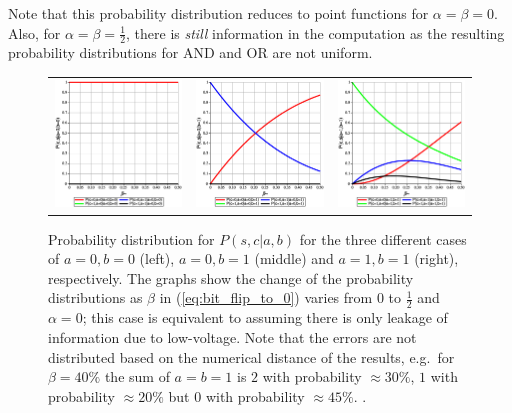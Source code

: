 Note that this probability distribution reduces to point functions for $\alpha = \beta = 0$. Also, for $\alpha = \beta = \frac{1}{2}$, there is {\em still} information in the computation as the resulting probability distributions for AND and OR are not uniform.

\begin{figure}
    \begin{tabular}{ccc}
        \includegraphics[width=.3\textwidth]{media/noisy_half_adder_value_dist_00.eps} &
        \includegraphics[width=.3\textwidth]{media/noisy_half_adder_value_dist_01.eps} &
        \includegraphics[width=.3\textwidth]{media/noisy_half_adder_value_dist_11.eps} 
    \end{tabular}
    \caption{Probability distribution for $P(s,c|a,b)$ for the three different cases of $a=0, b=0$ (left), $a=0, b=1$ (middle) and $a=1, b=1$ (right), respectively. The graphs show the change of the probability distributions as $\beta$ in (\ref{eq:bit_flip_to_0}) varies from $0$ to $\frac{1}{2}$ and $\alpha = 0$; this case is equivalent to assuming there is only leakage of information due to low-voltage. Note that the errors are not distributed based on the numerical distance of the results, e.g.\ for $\beta=40\%$ the sum of $a=b=1$ is $2$ with probability $\approx 30\%$, $1$ with probability $\approx 20\%$ but $0$ with probability $\approx 45\%$. \label{fig:noise_prob_dist}.}
\end{figure}

